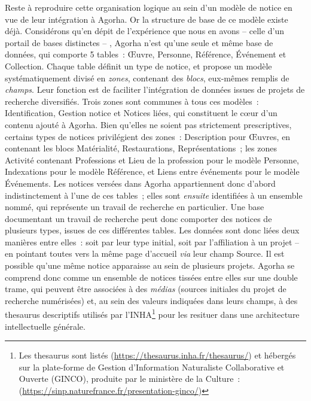 \documentclass[a4paper,12pt, twoside]{book}
\begin{document}
Reste à reproduire cette organisation logique au sein d’un modèle de notice en vue de leur intégration à Agorha. Or la structure de base de ce modèle existe déjà. Considérons qu’en dépit de l’expérience que nous en avons – celle d’un portail de bases distinctes – , Agorha n’est qu’une seule et même base de données, qui comporte 5 tables~: \textsf{Œuvre, Personne, Référence, Événement} et \textsf{Collection}. Chaque table définit un type de notice, et propose un modèle systématiquement divisé en \textit{zones}, contenant des \textit{blocs}, eux-mêmes remplis de \textit{champs}. Leur fonction est de faciliter l’intégration de données issues de projets de recherche diversifiés. Trois zones sont communes à tous ces modèles~: \textsf{Identification, Gestion notice} et \textsf{Notices liées}, qui constituent le cœur d’un contenu ajouté à Agorha. Bien qu’elles ne soient pas strictement prescriptives, certains types de notices privilégient des zones~: \textsf{Description} pour \textsf{Œuvres}, en contenant les blocs \textsf{Matérialité, Restaurations, Représentations}~; les zones \textsf{Activité} contenant \textsf{Professions} et \textsf{Lieu de la profession} pour le modèle \textsf{Personne}, \textsf{Indexations} pour le modèle \textsf{Référence}, et \textsf{Liens entre événements} pour le modèle \textsf{Événements}. Les notices versées dans Agorha appartiennent donc d’abord indistinctement à l’une de ces tables~; elles sont \textit{ensuite} identifiées à un ensemble nommé, qui représente un travail de recherche en particulier. Une base documentant un travail de recherche peut donc comporter des notices de plusieurs types, issues de ces différentes tables. Les données sont donc liées deux manières entre elles~: soit par leur type initial, soit par l’affiliation à un projet – en pointant toutes vers la même page d’accueil \textit{via} leur champ \textsf{Source}. Il est possible qu’une même notice apparaisse au sein de plusieurs projets. Agorha se comprend donc comme un ensemble de notices tissées entre elles sur une double trame, qui peuvent être associées à des \textit{médias} (sources initiales du projet de recherche numérisées) et, au sein des valeurs indiquées dans leurs champs, à des thesaurus descriptifs utilisés par l’INHA\footnote{Les thesaurus sont listés (\url{https://thesaurus.inha.fr/thesaurus/}) et hébergés sur la plate-forme de Gestion d’Information Naturaliste Collaborative et Ouverte (GINCO), produite par le ministère de la Culture~:(\url{https://sinp.naturefrance.fr/presentation-ginco/})} pour les resituer dans une architecture intellectuelle générale.
\end{document}
